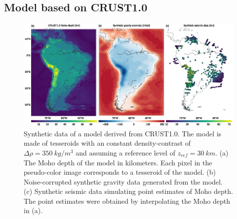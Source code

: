 \documentclass[extra,mreferee]{gji}
\begin{document}





\subsection{Model based on CRUST1.0}\label{sec:crust1}

\begin{figure}
    \centering
    \includegraphics[width=\textwidth]{figures/synthetic-crust1-data}
    \caption{
        Synthetic data of a model derived from CRUST1.0.
        The model is made of tesseroids with an constant density-contrast
        of $\Delta\rho = 350\ kg/m^3$ and assuming a reference level of
        $z_{ref} = 30\ km$.
        (a) The Moho depth of the model in kilometers.
        Each pixel in the pseudo-color image corresponds to a tesseroid of the
        model.
        (b) Noise-corrupted synthetic gravity data generated from the model.
        (c) Synthetic seismic data simulating point estimates of Moho depth.
        The point estimates were obtained by interpolating
        the Moho depth in (a).
    }
    \label{fig:crust1-data}
\end{figure}
\end{document}
